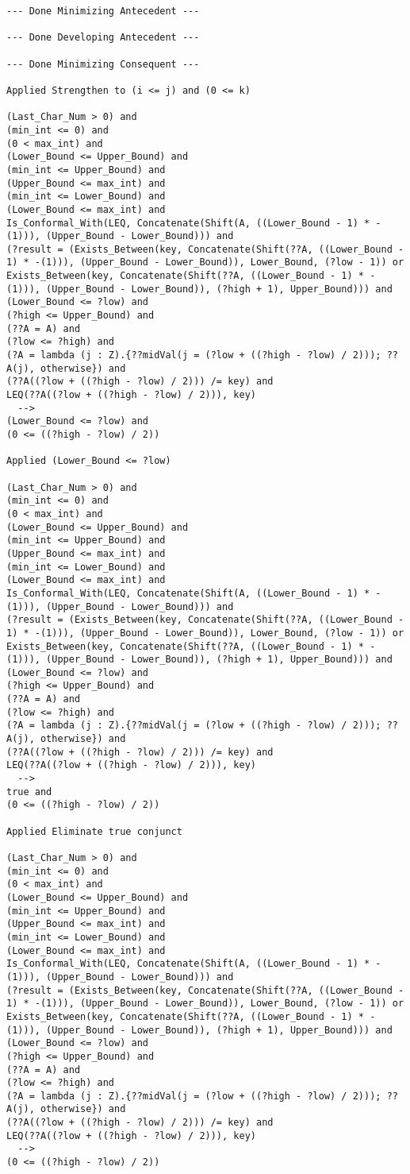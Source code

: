 \begin{lstlisting}[language=resolve]
--- Done Minimizing Antecedent ---

--- Done Developing Antecedent ---

--- Done Minimizing Consequent ---

Applied Strengthen to (i <= j) and (0 <= k)

(Last_Char_Num > 0) and
(min_int <= 0) and
(0 < max_int) and
(Lower_Bound <= Upper_Bound) and
(min_int <= Upper_Bound) and
(Upper_Bound <= max_int) and
(min_int <= Lower_Bound) and
(Lower_Bound <= max_int) and
Is_Conformal_With(LEQ, Concatenate(Shift(A, ((Lower_Bound - 1) * -(1))), (Upper_Bound - Lower_Bound))) and
(?result = (Exists_Between(key, Concatenate(Shift(??A, ((Lower_Bound - 1) * -(1))), (Upper_Bound - Lower_Bound)), Lower_Bound, (?low - 1)) or Exists_Between(key, Concatenate(Shift(??A, ((Lower_Bound - 1) * -(1))), (Upper_Bound - Lower_Bound)), (?high + 1), Upper_Bound))) and
(Lower_Bound <= ?low) and
(?high <= Upper_Bound) and
(??A = A) and
(?low <= ?high) and
(?A = lambda (j : Z).{??midVal(j = (?low + ((?high - ?low) / 2))); ??A(j), otherwise}) and
(??A((?low + ((?high - ?low) / 2))) /= key) and
LEQ(??A((?low + ((?high - ?low) / 2))), key)
  -->
(Lower_Bound <= ?low) and
(0 <= ((?high - ?low) / 2))

Applied (Lower_Bound <= ?low)

(Last_Char_Num > 0) and
(min_int <= 0) and
(0 < max_int) and
(Lower_Bound <= Upper_Bound) and
(min_int <= Upper_Bound) and
(Upper_Bound <= max_int) and
(min_int <= Lower_Bound) and
(Lower_Bound <= max_int) and
Is_Conformal_With(LEQ, Concatenate(Shift(A, ((Lower_Bound - 1) * -(1))), (Upper_Bound - Lower_Bound))) and
(?result = (Exists_Between(key, Concatenate(Shift(??A, ((Lower_Bound - 1) * -(1))), (Upper_Bound - Lower_Bound)), Lower_Bound, (?low - 1)) or Exists_Between(key, Concatenate(Shift(??A, ((Lower_Bound - 1) * -(1))), (Upper_Bound - Lower_Bound)), (?high + 1), Upper_Bound))) and
(Lower_Bound <= ?low) and
(?high <= Upper_Bound) and
(??A = A) and
(?low <= ?high) and
(?A = lambda (j : Z).{??midVal(j = (?low + ((?high - ?low) / 2))); ??A(j), otherwise}) and
(??A((?low + ((?high - ?low) / 2))) /= key) and
LEQ(??A((?low + ((?high - ?low) / 2))), key)
  -->
true and
(0 <= ((?high - ?low) / 2))

Applied Eliminate true conjunct

(Last_Char_Num > 0) and
(min_int <= 0) and
(0 < max_int) and
(Lower_Bound <= Upper_Bound) and
(min_int <= Upper_Bound) and
(Upper_Bound <= max_int) and
(min_int <= Lower_Bound) and
(Lower_Bound <= max_int) and
Is_Conformal_With(LEQ, Concatenate(Shift(A, ((Lower_Bound - 1) * -(1))), (Upper_Bound - Lower_Bound))) and
(?result = (Exists_Between(key, Concatenate(Shift(??A, ((Lower_Bound - 1) * -(1))), (Upper_Bound - Lower_Bound)), Lower_Bound, (?low - 1)) or Exists_Between(key, Concatenate(Shift(??A, ((Lower_Bound - 1) * -(1))), (Upper_Bound - Lower_Bound)), (?high + 1), Upper_Bound))) and
(Lower_Bound <= ?low) and
(?high <= Upper_Bound) and
(??A = A) and
(?low <= ?high) and
(?A = lambda (j : Z).{??midVal(j = (?low + ((?high - ?low) / 2))); ??A(j), otherwise}) and
(??A((?low + ((?high - ?low) / 2))) /= key) and
LEQ(??A((?low + ((?high - ?low) / 2))), key)
  -->
(0 <= ((?high - ?low) / 2))


\end{lstlisting}
